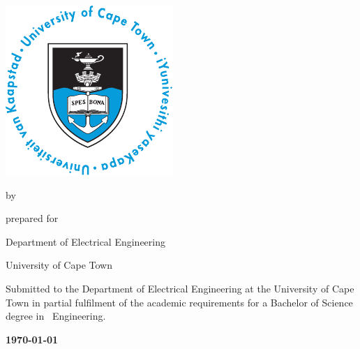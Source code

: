 \begin{titlepage}
  \null\vfill
  {\centering\Huge\bfseries\thetitle\par}
  \vfill
  \vskip 5mm
  {\centering\includegraphics[scale=1.1]{figures/logo}\par}
  \vfill
  \begin{center}by \textsc{\theauthor}\end{center}
  \vfill
  {\centering prepared for \textsc{\thesupervisor}\par Department of Electrical Engineering\par University of Cape Town\par}
  \vfill
  \noindent
  Submitted to the Department of Electrical Engineering at the University of Cape Town in partial fulfilment of the academic requirements for a Bachelor of Science degree in \thestream~Engineering.
  \vfill
  \begin{center}\bfseries\today\end{center}
  \vfill
\end{titlepage}
